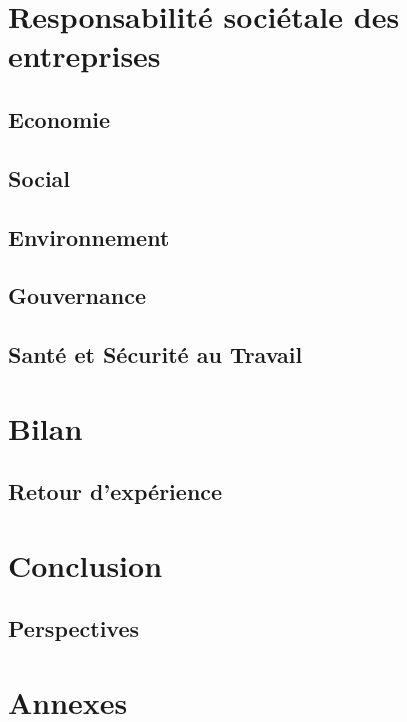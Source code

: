 \documentclass[12pt, oneside, a4paper, titlepage]{report}
\begin{document}
\chapter{Responsabilité sociétale des entreprises}%
\label{cha:rse}

\section{Economie}%
\label{sec:rse::eco}

\section{Social}%
\label{sec:rse::social}

\section{Environnement}%
\label{sec:rse::env}

\section{Gouvernance}%
\label{sec:rse::gouv}

\section{Santé et Sécurité au Travail}%
\label{sec:rse::sst}

\chapter{Bilan}%
\label{cha:bilan}

\section{Retour d'expérience}%
\label{sec:bilan::ret-exp}

\chapter{Conclusion}%
\label{cha:conclu}

\section{Perspectives}%
\label{sec:conclu::persp}

\chapter{Annexes}%
\label{cha:annexes}
\end{document}

